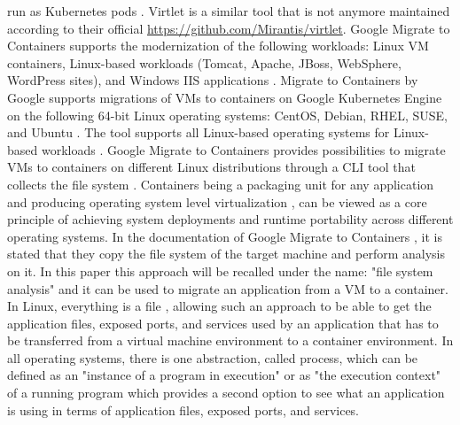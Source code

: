\documentclass{article}
\begin{document}
\begin{multicols}{2}
run as Kubernetes pods \cite{Sheldon-2022}. Virtlet is a similar tool \cite{Sheldon-2022} that is not anymore maintained according to their official \href{Github repository}{https://github.com/Mirantis/virtlet}.
Google Migrate to Containers supports the modernization of the following workloads: Linux VM containers, Linux-based workloads (Tomcat, Apache, JBoss, WebSphere, WordPress sites), and Windows IIS applications \cite{Google-2024}. Migrate to Containers by Google supports migrations of VMs to containers on Google Kubernetes Engine on the following 64-bit Linux operating systems: CentOS, Debian, RHEL, SUSE, and Ubuntu \cite{Google-2024}. The tool supports all Linux-based operating systems for Linux-based workloads \cite{Google-2024}. Google Migrate to Containers provides possibilities to migrate VMs to containers on different Linux distributions through a CLI tool that collects the file system \cite{Google-2024}. Containers being a packaging unit for any application and producing operating system level virtualization \cite{SiddiquiEtAl-2020}, can be viewed as a core principle of achieving system deployments and runtime portability across different operating systems.
In the documentation of Google Migrate to Containers \cite{Google-2024}, it is stated that they copy the file system of the target machine and perform analysis on it. In this paper this approach will be recalled under the name: "file system analysis" and it can be used to migrate an application from a VM to a container. In Linux, everything is a file \cite{Torvalds-2002}, allowing such an approach to be able to get the application files, exposed ports, and services used by an application that has to be transferred from a virtual machine environment to a container environment. In all operating systems, there is one abstraction, called process, which can be defined as an "instance of a program in execution" or as "the execution context" of a running program \cite{BovetEtAl-2005} which provides a second option to see what an application is using in terms of application files, exposed ports, and services. 

\end{multicols}
\end{document}
